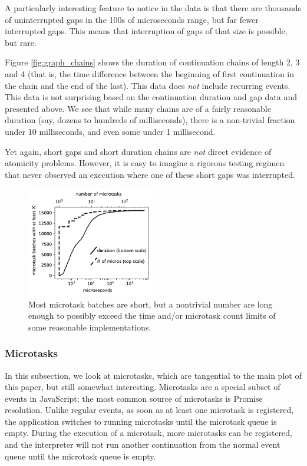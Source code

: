 \documentclass[acmsmall,anonymous,review]{acmart}\settopmatter{printfolios=true,printccs=false,printacmref=false}
\begin{document}
A particularly interesting feature to notice in the data is that there are thousands of uninterrupted gaps in the 100s of microseconds range, but far fewer interrupted gaps.
This means that interruption of gaps of that size is possible, but rare.

Figure \ref{fig:graph_chains} shows the duration of continuation chains of length 2, 3 and 4 (that is, the time difference between the beginning of first continuation in the chain and the end of the last).
This data does \emph{not} include recurring events.
This data is not surprising based on the continuation duration and gap data and presented above.
We see that while many chains are of a fairly reasonable duration (say, dozens to hundreds of milliseconds), there is a non-trivial fraction under 10 milliseconds, and even some under 1 millisecond.

Yet again, short gaps and short duration chains are \emph{not} direct evidence of atomicity problems.
However, it is easy to imagine a rigorous testing regimen that never observed an execution where one of these short gaps was interrupted.

\begin{figure}
\hspace*{-0.2cm}\includegraphics[width=0.5\textwidth]{micros_graph_bw}
\caption{Most microtask batches are short, but a nontrivial number are long enough to possibly exceed the time and/or microtask count limits of some reasonable implementations.}
\label{fig:graph_microtasks}
\end{figure}

\subsubsection{Microtasks}

In this subsection, we look at microtasks, which are tangential to the main plot of this paper, but still somewhat interesting.
Microtasks are a special subset of events in JavaScript; the most common source of microtasks is Promise resolution.
Unlike regular events, as soon as at least one microtask is registered, the application switches to running microtasks until the microtask queue is empty.
During the execution of a microtask, more microtasks can be registered, and the interpreter will not run another continuation from the normal event queue until the microtask queue is empty.
\end{document}
